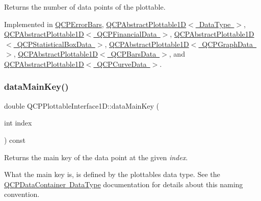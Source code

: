 Returns the number of data points of the plottable. 

Implemented in \mbox{\hyperlink{class_q_c_p_error_bars_ad8811b034a17cb4ef898cbcc8da29bd2}{Q\+C\+P\+Error\+Bars}}, \mbox{\hyperlink{class_q_c_p_abstract_plottable1_d_a354545da303458283df3f7948a7a768b}{Q\+C\+P\+Abstract\+Plottable1\+D$<$ Data\+Type $>$}}, \mbox{\hyperlink{class_q_c_p_abstract_plottable1_d_a354545da303458283df3f7948a7a768b}{Q\+C\+P\+Abstract\+Plottable1\+D$<$ Q\+C\+P\+Financial\+Data $>$}}, \mbox{\hyperlink{class_q_c_p_abstract_plottable1_d_a354545da303458283df3f7948a7a768b}{Q\+C\+P\+Abstract\+Plottable1\+D$<$ Q\+C\+P\+Statistical\+Box\+Data $>$}}, \mbox{\hyperlink{class_q_c_p_abstract_plottable1_d_a354545da303458283df3f7948a7a768b}{Q\+C\+P\+Abstract\+Plottable1\+D$<$ Q\+C\+P\+Graph\+Data $>$}}, \mbox{\hyperlink{class_q_c_p_abstract_plottable1_d_a354545da303458283df3f7948a7a768b}{Q\+C\+P\+Abstract\+Plottable1\+D$<$ Q\+C\+P\+Bars\+Data $>$}}, and \mbox{\hyperlink{class_q_c_p_abstract_plottable1_d_a354545da303458283df3f7948a7a768b}{Q\+C\+P\+Abstract\+Plottable1\+D$<$ Q\+C\+P\+Curve\+Data $>$}}.

\mbox{\label{class_q_c_p_plottable_interface1_d_a2bd60daaac046945fead558cbd83cf73}} 
\subsubsection{\texorpdfstring{data\+Main\+Key()}{dataMainKey()}}
{\footnotesize\ttfamily double Q\+C\+P\+Plottable\+Interface1\+D\+::data\+Main\+Key (\begin{DoxyParamCaption}\item[{int}]{index }\end{DoxyParamCaption}) const\hspace{0.3cm}{\ttfamily [pure virtual]}}

Returns the main key of the data point at the given {\itshape index}.

What the main key is, is defined by the plottable\textquotesingle{}s data type. See the \mbox{\hyperlink{class_q_c_p_data_container_qcpdatacontainer-datatype}{Q\+C\+P\+Data\+Container Data\+Type}} documentation for details about this naming convention. 


